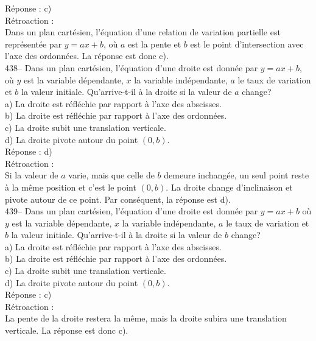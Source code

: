 ﻿\documentclass[letterpaper, 12pt]{article}
\begin{document}
R\'eponse : c)\\

R\'etroaction : \\
Dans un plan cart\'esien, l'\'equation d'une relation de variation partielle
est repr\'esent\'ee par $y=ax+b$, o\`u $a$ est la pente et $b$ est le point
d'intersection avec l'axe des ordonn\'ees.  La r\'eponse est donc c).\\

438-- Dans un plan cart\'esien, l'\'equation d'une droite est donn\'ee par
$y=ax+b$, o\`u $y$ est la variable d\'ependante, $x$ la variable
ind\'ependante, $a$ le taux de variation et $b$ la valeur initiale.
Qu'arrive-t-il \`a la droite si la valeur de $a$ change?\\
a) La droite est r\'efl\'echie par rapport \`a l'axe des abscisses.\\
b) La droite est r\'efl\'echie par rapport \`a l'axe des ordonn\'ees.\\
c) La droite subit une translation verticale.\\
d) La droite pivote autour du point $(0,b)$.\\

R\'eponse : d)\\

R\'etroaction : \\
Si la valeur de $a$ varie, mais que celle de $b$ demeure inchang\'ee, un
seul point reste \`a la m\^eme position et c'est le point $(0,b)$.  La
droite change d'inclinaison et pivote autour de ce point.  Par cons\'equent,
la r\'eponse est d).\\

439-- Dans un plan cart\'esien, l'\'equation d'une droite est donn\'ee par
$y=ax+b$ o\`u $y$ est la variable d\'ependante, $x$ la variable
ind\'ependante, $a$ le taux de variation et $b$ la valeur initiale.
Qu'arrive-t-il \`a la droite si la valeur de $b$ change?\\
a) La droite est r\'efl\'echie par rapport \`a l'axe des abscisses.\\
b) La droite est r\'efl\'echie par rapport \`a l'axe des ordonn\'ees.\\
c) La droite subit une translation verticale.\\
d) La droite pivote autour du point $(0,b)$.\\

R\'eponse : c)\\

R\'etroaction : \\
La pente de la droite restera la m\^eme, mais la droite subira une
translation verticale.  La r\'eponse est donc c).\\
\end{document}
